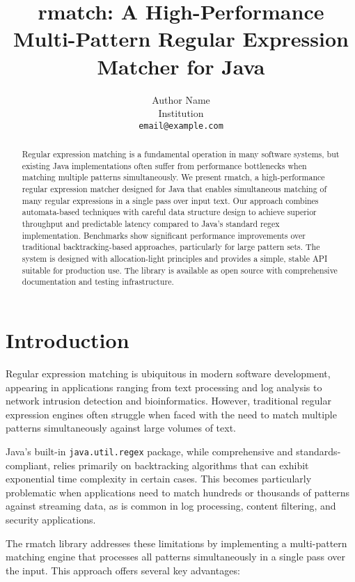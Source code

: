 \documentclass{article}
\title{rmatch: A High-Performance Multi-Pattern Regular Expression Matcher for Java}
\author{Author Name\\
        Institution\\
        \texttt{email@example.com}}
\begin{document}
\maketitle

\begin{abstract}
Regular expression matching is a fundamental operation in many software systems, but existing Java implementations often suffer from performance bottlenecks when matching multiple patterns simultaneously. We present rmatch, a high-performance regular expression matcher designed for Java that enables simultaneous matching of many regular expressions in a single pass over input text. Our approach combines automata-based techniques with careful data structure design to achieve superior throughput and predictable latency compared to Java's standard regex implementation. Benchmarks show significant performance improvements over traditional backtracking-based approaches, particularly for large pattern sets. The system is designed with allocation-light principles and provides a simple, stable API suitable for production use.  The library is available as open source with comprehensive documentation and testing infrastructure.
\end{abstract}

\section{Introduction}

Regular expression matching is ubiquitous in modern software development, appearing in applications ranging from text processing and log analysis to network intrusion detection and bioinformatics. However, traditional regular expression engines often struggle when faced with the need to match multiple patterns simultaneously against large volumes of text.

Java's built-in \texttt{java.util.regex} package, while comprehensive and standards-compliant, relies primarily on backtracking algorithms that can exhibit exponential time complexity in certain cases. This becomes particularly problematic when applications need to match hundreds or thousands of patterns against streaming data, as is common in log processing, content filtering, and security applications.

The rmatch library addresses these limitations by implementing a multi-pattern matching engine that processes all patterns simultaneously in a single pass over the input.  This approach offers several key advantages:
\end{document}
